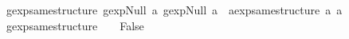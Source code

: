 \begin{isabellebody}
\ \ {\isachardoublequoteopen}gexp{\isacharunderscore}same{\isacharunderscore}structure\ {\isacharparenleft}gexp{\isachardot}Null\ a{}{\isacharparenright}\ {\isacharparenleft}gexp{\isachardot}Null\ a{}{\isacharparenright}\ {\isacharequal}\ aexp{\isacharunderscore}same{\isacharunderscore}structure\ a{}\ a{}{\isachardoublequoteclose}\ {\isacharbar}\isanewline
\ \ {\isachardoublequoteopen}gexp{\isacharunderscore}same{\isacharunderscore}structure\ {\isacharunderscore}\ {\isacharunderscore}\ {\isacharequal}\ False{\isachardoublequoteclose}\isanewline
%
\isadelimtheory
\isanewline
%
\endisadelimtheory
%
\isatagtheory
{}\isamarkupfalse%
%
\endisatagtheory
{\isafoldtheory}%
%
\isadelimtheory
%
\endisadelimtheory
%
\end{isabellebody}%
\endinput
